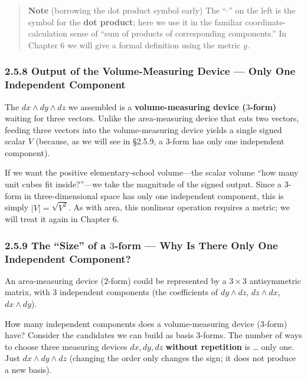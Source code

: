 \documentclass[a4paper,12pt,openany]{book}
\begin{document}
\begin{quote}
\textbf{Note} (borrowing the dot product symbol early) The ``\(\cdot\)''
on the left is the symbol for the \textbf{dot product}; here we use it
in the familiar coordinate-calculation sense of ``sum of products of
corresponding components.'' In Chapter 6 we will give a formal
definition using the metric \(g\).
\end{quote}

\hypertarget{output-of-the-volume-measuring-device-only-one-independent-component}{%
\subsubsection{2.5.8 Output of the Volume-Measuring Device — Only One
Independent
Component}\label{output-of-the-volume-measuring-device-only-one-independent-component}}

The \(dx \wedge dy \wedge dz\) we assembled is a
\textbf{volume-measuring device (\(3\)-form)} waiting for three vectors.
Unlike the area-measuring device that eats two vectors, feeding three
vectors into the volume-measuring device yields a single signed scalar
\(V\) (because, as we will see in §2.5.9, a \(3\)-form has only one
independent component).

If we want the positive elementary-school volume—the scalar volume
``how many unit cubes fit inside?''—we take the magnitude of the
signed output. Since a \(3\)-form in three-dimensional space has only
one independent component, this is simply \(|V|=\sqrt{V^2}\). As with
area, this nonlinear operation requires a metric; we will treat it again
in Chapter 6.

\hypertarget{the-size-of-a-3-form-why-is-there-only-one-independent-component}{%
\subsubsection{\texorpdfstring{2.5.9 The ``Size'' of a \(3\)-form —
Why Is There Only One Independent
Component?}{2.5.9 The ``Size'' of a 3-form — Why Is There Only One Independent Component?}}\label{the-size-of-a-3-form-why-is-there-only-one-independent-component}}

An area-measuring device (\(2\)-form) could be represented by a
\(3 \times 3\) antisymmetric matrix, with 3 independent components (the
coefficients of \(dy \wedge dz\), \(dz \wedge dx\), \(dx \wedge dy\)).

How many independent components does a volume-measuring device
(\(3\)-form) have? Consider the candidates we can build as basis
\(3\)-forms. The number of ways to choose three measuring devices
\(dx, dy, dz\) \textbf{without repetition} is \ldots{} only one. Just
\(dx \wedge dy \wedge dz\) (changing the order only changes the sign; it
does not produce a new basis).
\end{document}
